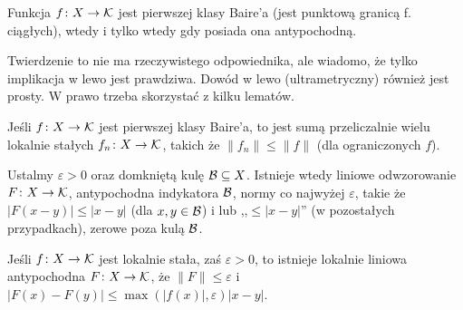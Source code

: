 \begin{fakt}
	Funkcja $f \colon X \to \mathcal K$ jest pierwszej klasy Baire'a (jest punktową granicą f. ciągłych), wtedy i tylko wtedy gdy posiada ona antypochodną.
\end{fakt}

Twierdzenie to nie ma rzeczywistego odpowiednika, ale wiadomo, że tylko implikacja w lewo jest prawdziwa.
Dowód w lewo (ultrametryczny) również jest prosty.
W prawo trzeba skorzystać z kilku lematów.

\begin{lemat}
	Jeśli $f \colon X \to \mathcal K$ jest pierwszej klasy Baire'a, to jest sumą przeliczalnie wielu lokalnie stałych $f_n \colon X \to \mathcal K$, takich że $\|f_n\| \le \|f\|$ (dla ograniczonych $f$).
\end{lemat}

\begin{lemat}
	Ustalmy $\varepsilon > 0$ oraz domkniętą kulę $\mathcal B \subseteq X$.
	Istnieje wtedy liniowe odwzorowanie $F \colon X \to \mathcal K$, antypochodna indykatora $\mathcal B$, normy co najwyżej $\varepsilon$, takie że $|F(x-y)| \le |x- y|$ (dla $x, y \in \mathcal B$) i lub ,,$\le |x-y|$'' (w pozostałych przypadkach), zerowe poza kulą $\mathcal B$.
\end{lemat}

\begin{lemat}
	Jeśli $f \colon X \to \mathcal K$ jest lokalnie stała, zaś $\varepsilon > 0$, to istnieje lokalnie liniowa antypochodna $F \colon X \to \mathcal K$, że $\|F\| \le \varepsilon$ i $|F(x) - F(y)| \le \max (|f(x)|, \varepsilon) |x-y|$.
\end{lemat}	